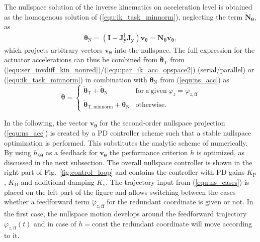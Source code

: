 \documentclass[runningheads]{llncs}
\newcommand{\bm}[1]{\boldsymbol{#1}}
\begin{document}
The nullspace solution of the inverse kinematics on acceleration level is obtained as the homogenous solution of (\ref{equ:ik_task_minnorm}), neglecting the term $\dot{\bm{N}}_{\bm{\theta}}$, as
\begin{align}
\ddot{\bm{\theta}}_\mathrm{N}
= (\bm{I}-\bm{J}_{\bm{y}}^{\dagger}\bm{J}_{\bm{y}}) \bm{v}_{\bm{\theta}}
=
\bm{N}_{\bm{\theta}} \bm{v}_{\bm{\theta}},
\label{equ:ns_acc}
\end{align}
which projects arbitrary vectors $\bm{v}_{\bm{\theta}}$ into the nullspace.
%
The full expression for the actuator accelerations can thus be combined from $\ddot{\bm{\theta}}_\mathrm{T}$ from (\ref{equ:ser_invdiff_kin_nonred})/(\ref{equ:par_ik_acc_opspace2}) (serial/parallel) or (\ref{equ:ik_task_minnorm}) in combination with $\ddot{\bm{\theta}}_\mathrm{N}$ from (\ref{equ:ns_acc}) as
%
\begin{equation}
\ddot{\bm{\theta}} = 
\begin{cases} 
\ddot{\bm{\theta}}_\mathrm{T} + \ddot{\bm{\theta}}_\mathrm{N}  &  \mathrm{for~a~given~}\varphi_{z}=\varphi_{z,\mathrm{ff}} \\
\ddot{\bm{\theta}}_{\mathrm{T,minnorm}} +\ddot{\bm{\theta}}_\mathrm{N}
& \mathrm {otherwise.}
\end{cases}
\label{equ:ns_cases}
\end{equation}


In the following, the vector $\bm{v}_{\bm{\theta}}$ for the second-order nullspace projection (\ref{equ:ns_acc}) is created by a PD controller scheme \cite{DeLucaOriSic1992,SchapplerOrt2021} such that a stable nullspace optimization is performed.
This substitutes the analytic scheme of \cite{ReiterMueGat2018} numerically.
%
By using $h_{\partial \bm{\theta}}$ as a feedback for $\bm{v}_{\bm{\theta}}$ the performance criterion $h$ is optimized, as discussed in the next subsection.
The overall nullspace controller is shown in the right part of  Fig.~\ref{fig:control_loop} and contains the  controller with PD gains $K_\mathrm{P}$,  $K_\mathrm{D}$ and additional damping  $K_\mathrm{v}$.
The trajectory input from (\ref{equ:ns_cases}) is placed on the left part of the figure and allows switching between the cases whether a feedforward term $\ddot{\varphi}_{z,\mathrm{ff}}$ for the redundant coordinate is given or not.
In the first case, the nullspace motion develops around the feedforward trajectory $\varphi_{z,\mathrm{ff}}(t)$ and in case of $h=\mathrm{const}$ the redundant coordinate will move according to it.
\end{document}
